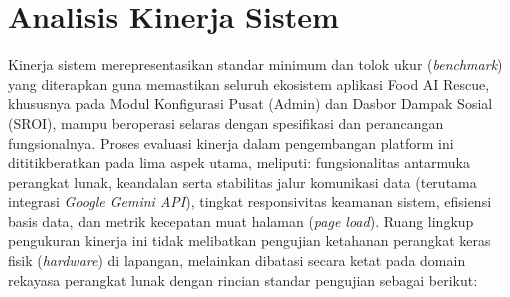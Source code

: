 \section{Analisis Kinerja Sistem}
Kinerja sistem merepresentasikan standar minimum dan tolok ukur (\textit{benchmark}) yang diterapkan guna memastikan seluruh ekosistem aplikasi Food AI Rescue, khususnya pada Modul Konfigurasi Pusat (Admin) dan Dasbor Dampak Sosial (SROI), mampu beroperasi selaras dengan spesifikasi dan perancangan fungsionalnya. Proses evaluasi kinerja dalam pengembangan platform ini dititikberatkan pada lima aspek utama, meliputi: fungsionalitas antarmuka perangkat lunak, keandalan serta stabilitas jalur komunikasi data (terutama integrasi \textit{Google Gemini API}), tingkat responsivitas keamanan sistem, efisiensi basis data, dan metrik kecepatan muat halaman (\textit{page load}). Ruang lingkup pengukuran kinerja ini tidak melibatkan pengujian ketahanan perangkat keras fisik (\textit{hardware}) di lapangan, melainkan dibatasi secara ketat pada domain rekayasa perangkat lunak dengan rincian standar pengujian sebagai berikut:

